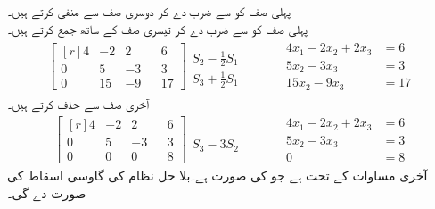 پہلی صف کو  سے ضرب دے کر دوسری صف سے منفی کرتے ہیں۔\\
پہلی صف کو  سے ضرب دے کر تیسری صف کے ساتھ جمع کرتے ہیں۔
\begin{gather*}
\begin{bmatrix*}[r] 4&-2&2&&6\\0&5&-3&&3\\0&15&-9&&17  \end{bmatrix*}\begin{matrix}\\S_2-\frac{1}{2}S_1\\S_3+\frac{1}{2}S_1  \end{matrix}\quad \quad \quad 
\begin{aligned}
4x_1-2x_2+2x_3&=6\\
5x_2-3x_3&=3\\
15x_2-9x_3&=17
\end{aligned}
\end{gather*}
آخری صف سے  حذف کرتے ہیں۔
\begin{gather*}
\begin{bmatrix*}[r] 4&-2&2&&6\\0&5&-3&&3\\0&0&0&&8  \end{bmatrix*}\begin{matrix}\\\\S_3-3S_2  \end{matrix}\quad \quad \quad 
\begin{aligned}
4x_1-2x_2+2x_3&=6\\
5x_2-3x_3&=3\\
0&=8
\end{aligned}
\end{gather*}
آخری مساوات کے تحت  ہے جو  کی صورت ہے۔بلا حل نظام کی گاوسی اسقاط  کی صورت دے گی۔


